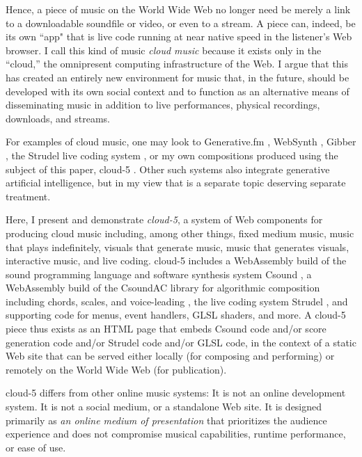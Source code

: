 \documentclass[runningheads,a4paper]{llncs}
\begin{document}
Hence, a piece of music on the World Wide Web no longer need be merely a link to a downloadable soundfile or video, or even to a stream. A piece can, indeed, be its own ``app" that is live code running at near native speed  in the listener's Web browser. I call this kind of music \emph{cloud music} because it exists only in the ``cloud,'' the omnipresent computing infrastructure of the Web. I argue that this has created an entirely new environment for music that, in the future, should be developed with its own social context and to function as an alternative means of disseminating music in addition to live performances, physical recordings, downloads, and streams. 

For examples of cloud music, one may look to Generative.fm \cite{alexbainter}, WebSynth \cite{websynth}, Gibber \cite{gibber}, the Strudel live coding system \cite{strudel}, or my own compositions produced using the subject of this paper, cloud-5 \cite{cloud5}. Other such systems also integrate generative artificial intelligence, but in my view that is a separate topic deserving separate treatment.

Here, I present and demonstrate \emph{cloud-5}, a system of Web components for producing cloud music including, among other things, fixed medium music, music that plays indefinitely, visuals that generate music, music that generates visuals, interactive music, and live coding. cloud-5 includes a WebAssembly build \cite{csoundwasm} of the sound programming language and software synthesis system Csound \cite{csound} \cite{csoundbook} \cite{csoundreference} \cite{csoundapireference}, a WebAssembly build \cite{csoundwasm} of the CsoundAC library for algorithmic composition including chords, scales, and voice-leading \cite{csoundac} \cite{csoundacapi}, the live coding system Strudel \cite{strudel}, and supporting code for menus, event handlers, GLSL shaders, and more. A cloud-5 piece thus exists as an HTML page that embeds Csound code and/or score generation code and/or Strudel code and/or GLSL code, in the context of a static Web site that can be served either locally (for composing and performing) or remotely on the World Wide Web (for publication). 

cloud-5 differs from other online music systems: It is not an online development system. It is not a social medium, or a standalone Web site. It is designed primarily as \emph{an online medium of presentation} that prioritizes the audience experience and does not compromise musical capabilities, runtime performance, or ease of use.
\end{document}
